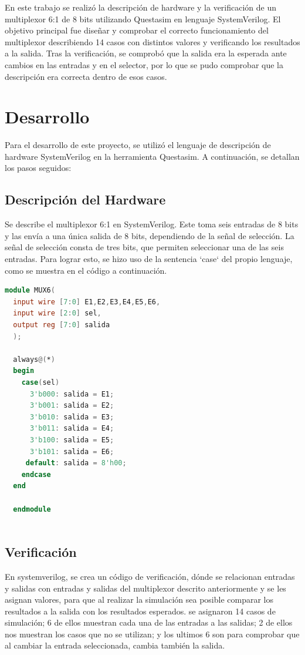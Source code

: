 \documentclass[9pt,technote]{IEEEtran}
\begin{document}
	En este trabajo se realizó la descripción de hardware y la verificación de un multiplexor 6:1 de 8 bits utilizando Questasim en lenguaje SystemVerilog. El objetivo principal fue diseñar y comprobar el correcto funcionamiento del multiplexor describiendo 14 casos con distintos valores y verificando los resultados a la salida. Tras la verificación, se comprobó que la salida era la esperada ante cambios en las entradas y en el selector, por lo que se pudo comprobar que la descripción era correcta dentro de esos casos.
	

	
	\section*{Desarrollo}
	Para el desarrollo de este proyecto, se utilizó el lenguaje de descripción de hardware SystemVerilog en la herramienta Questasim. A continuación, se detallan los pasos seguidos:
	
	\subsection{Descripción del Hardware}
	Se describe el multiplexor 6:1 en SystemVerilog. Este toma seis entradas de 8 bits y las envía a una única salida de 8 bits, dependiendo de la señal de selección. La señal de selección consta de tres bits, que permiten seleccionar una de las seis entradas. Para lograr esto, se hizo uso de la sentencia `case` del propio lenguaje, como se muestra en el código a continuación.
	
	\begin{lstlisting}[language=Verilog, 
	caption={Descripción del multiplexor 6:1 en SystemVerilog}, 
	label={code:6to1mux}]
  module MUX6(
  input wire [7:0] E1,E2,E3,E4,E5,E6,
  input wire [2:0] sel,
  output reg [7:0] salida
  );

  always@(*) 
  begin
	case(sel)
	  3'b000: salida = E1;
	  3'b001: salida = E2;
	  3'b010: salida = E3;
	  3'b011: salida = E4;
	  3'b100: salida = E5;
	  3'b101: salida = E6;
	 default: salida = 8'h00;
	endcase
  end
	
  endmodule
	
	\end{lstlisting}
	
	\subsection{Verificación}
	En systemverilog, se crea un código de verificación, dónde se relacionan entradas y salidas con entradas y salidas del multiplexor descrito anteriormente y se les asignan valores, para que al realizar la simulación sea posible comparar los resultados a la salida con los resultados esperados. se asignaron 14 casos de simulación; 6 de ellos muestran cada una de las entradas a las salidas; 2 de ellos nos muestran los casos que no se utilizan; y los ultimos 6 son para comprobar que al cambiar la entrada seleccionada, cambia también la salida.
	
\end{document}
